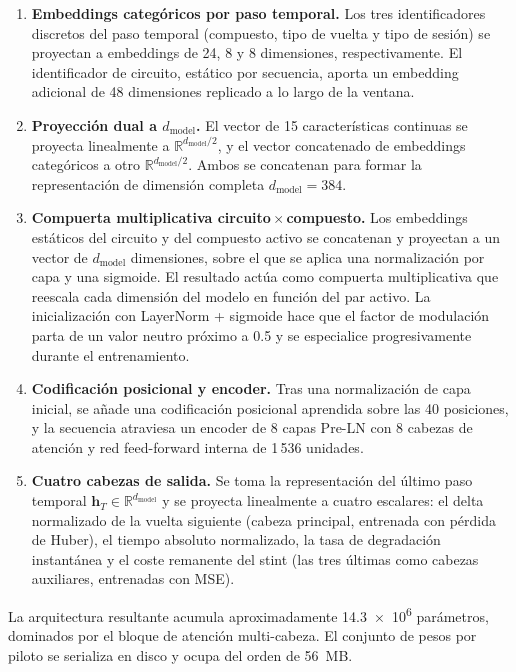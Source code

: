 \begin{enumerate}
    \item \textbf{Embeddings categóricos por paso temporal.} Los tres identificadores discretos del paso temporal (compuesto, tipo de vuelta y tipo de sesión) se proyectan a embeddings de 24, 8 y 8 dimensiones, respectivamente. El identificador de circuito, estático por secuencia, aporta un embedding adicional de 48 dimensiones replicado a lo largo de la ventana.
    \item \textbf{Proyección dual a $d_\text{model}$.} El vector de 15 características continuas se proyecta linealmente a $\mathbb{R}^{d_\text{model}/2}$, y el vector concatenado de embeddings categóricos a otro $\mathbb{R}^{d_\text{model}/2}$. Ambos se concatenan para formar la representación de dimensión completa $d_\text{model} = 384$.
    \item \textbf{Compuerta multiplicativa circuito\,$\times$\,compuesto.} Los embeddings estáticos del circuito y del compuesto activo se concatenan y proyectan a un vector de $d_\text{model}$ dimensiones, sobre el que se aplica una normalización por capa y una sigmoide. El resultado actúa como compuerta multiplicativa que reescala cada dimensión del modelo en función del par activo. La inicialización con LayerNorm + sigmoide hace que el factor de modulación parta de un valor neutro próximo a 0.5 y se especialice progresivamente durante el entrenamiento.
    \item \textbf{Codificación posicional y encoder.} Tras una normalización de capa inicial, se añade una codificación posicional aprendida sobre las 40 posiciones, y la secuencia atraviesa un encoder de 8 capas Pre-LN con 8 cabezas de atención y red feed-forward interna de 1\,536 unidades.
    \item \textbf{Cuatro cabezas de salida.} Se toma la representación del último paso temporal $\mathbf{h}_T \in \mathbb{R}^{d_\text{model}}$ y se proyecta linealmente a cuatro escalares: el delta normalizado de la vuelta siguiente (cabeza principal, entrenada con pérdida de Huber), el tiempo absoluto normalizado, la tasa de degradación instantánea y el coste remanente del stint (las tres últimas como cabezas auxiliares, entrenadas con MSE).
\end{enumerate}

La arquitectura resultante acumula aproximadamente \num{14.3e6} parámetros, dominados por el bloque de atención multi-cabeza. El conjunto de pesos por piloto se serializa en disco y ocupa del orden de \SI{56}{MB}.

